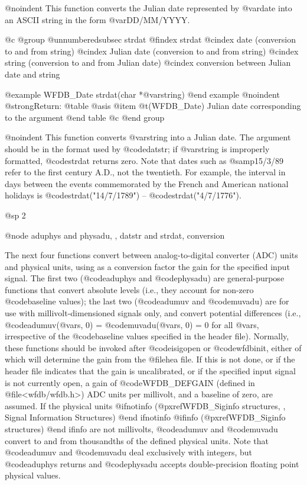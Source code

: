 {{{{{{{{@noindent
This function converts the Julian date represented by @var{date} into
an ASCII string in the form @var{DD/MM/YYYY}.

@c @group
@unnumberedsubsec strdat
@findex strdat
@cindex date (conversion to and from string)
@cindex Julian date (conversion to and from string)
@cindex string (conversion to and from Julian date)
@cindex conversion between Julian date and string

@example
WFDB_Date strdat(char *@var{string})
@end example
@noindent
@strong{Return:}
@table @asis
@item @t{(WFDB_Date)}
Julian date corresponding to the argument
@end table
@c @end group

@noindent
This function converts @var{string} into a Julian date.  The argument
should be in the format used by @code{datstr}; if @var{string} is
improperly formatted, @code{strdat} returns zero.  Note that dates such
as @samp{15/3/89} refer to the first century A.D., not the twentieth.
For example, the interval in days between the events commemorated by the
French and American national holidays is @code{strdat("14/7/1789")} --
@code{strdat("4/7/1776")}.

@sp 2

@node aduphys and physadu, , datstr and strdat, conversion

The next four functions convert between analog-to-digital converter
(ADC) units and physical units, using as a conversion factor the gain
for the specified input signal.  The first two (@code{aduphys} and
@code{physadu}) are general-purpose functions that convert absolute
levels (i.e., they account for non-zero @code{baseline} values); the
last two (@code{adumuv} and @code{muvadu}) are for use with
millivolt-dimensioned signals only, and convert potential differences
(i.e., @code{adumuv(@var{s}, 0)} = @code{muvadu(@var{s}, 0)} = 0 for all
@var{s}, irrespective of the @code{baseline} values specified in the
header file).  Normally, these functions should be invoked after
@code{isigopen} or @code{wfdbinit}, either of which will determine the
gain from the @file{hea} file.  If this is not done, or if the
header file indicates that the gain is uncalibrated, or if the
specified input signal is not currently open, a gain of @code{WFDB_DEFGAIN}
(defined in @file{<wfdb/wfdb.h>}) ADC units per millivolt, and a baseline
of zero, are assumed.  If the physical units
@ifnotinfo
(@pxref{WFDB_Siginfo structures, , Signal Information Structures})
@end ifnotinfo
@ifinfo
(@pxref{WFDB_Siginfo structures})
@end ifinfo
are not millivolts, @code{adumuv} and @code{muvadu} convert to and from
thousandths of the defined physical units.  Note that @code{adumuv} and
@code{muvadu} deal exclusively with integers, but @code{aduphys} returns
and @code{physadu} accepts double-precision floating point physical
values.

}}}}}}}}
